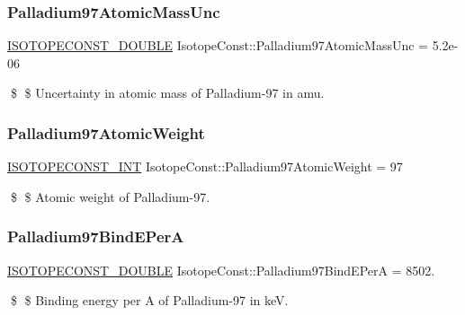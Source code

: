 \subsubsection{\texorpdfstring{Palladium97\+Atomic\+Mass\+Unc}{Palladium97AtomicMassUnc}}
{\footnotesize\ttfamily \mbox{\hyperlink{group___isotope_const-_macros_ga8f45a7272ce02c0b4c65c44636ed719a}{I\+S\+O\+T\+O\+P\+E\+C\+O\+N\+S\+T\+\_\+\+D\+O\+U\+B\+LE}} Isotope\+Const\+::\+Palladium97\+Atomic\+Mass\+Unc = 5.\+2e-\/06}

\$ \$ Uncertainty in atomic mass of Palladium-\/97 in amu. \mbox{\label{group___isotope_const-_palladium-_pd97_ga2e8f13d59b5db4f70bceaea8678579ca}} 
\subsubsection{\texorpdfstring{Palladium97\+Atomic\+Weight}{Palladium97AtomicWeight}}
{\footnotesize\ttfamily \mbox{\hyperlink{group___isotope_const-_macros_ga5f18360b3e99483a35c32d789e62621c}{I\+S\+O\+T\+O\+P\+E\+C\+O\+N\+S\+T\+\_\+\+I\+NT}} Isotope\+Const\+::\+Palladium97\+Atomic\+Weight = 97}

\$ \$ Atomic weight of Palladium-\/97. \mbox{\label{group___isotope_const-_palladium-_pd97_gaf43149884292d83b56522b373eb27914}} 
\subsubsection{\texorpdfstring{Palladium97\+Bind\+E\+PerA}{Palladium97BindEPerA}}
{\footnotesize\ttfamily \mbox{\hyperlink{group___isotope_const-_macros_ga8f45a7272ce02c0b4c65c44636ed719a}{I\+S\+O\+T\+O\+P\+E\+C\+O\+N\+S\+T\+\_\+\+D\+O\+U\+B\+LE}} Isotope\+Const\+::\+Palladium97\+Bind\+E\+PerA = 8502.}

\$ \$ Binding energy per A of Palladium-\/97 in keV. \mbox{\label{group___isotope_const-_palladium-_pd97_ga65815b91d5e4e851b19fab61a548ca73}} 
